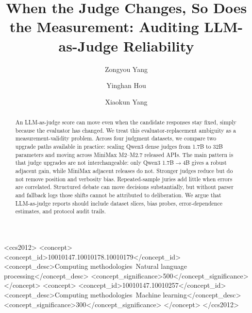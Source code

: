 \documentclass[sigconf,nonacm]{acmart}
\begin{document}
\title[When the Judge Changes, So Does the Measurement]{When the Judge Changes, So Does the Measurement: Auditing LLM-as-Judge Reliability}

\author{Zongyou Yang}

\author{Yinghan Hou}

\author{Xiaokun Yang}

\renewcommand{\shortauthors}{Z. Yang, Y. Hou, and X. Yang}

\begin{abstract}
An LLM-as-judge score can move even when the candidate responses stay fixed, simply because the evaluator has changed. We treat this evaluator-replacement ambiguity as a measurement-validity problem. Across four judgment datasets, we compare two upgrade paths available in practice: scaling Qwen3 dense judges from 1.7B to 32B parameters and moving across MiniMax M2--M2.7 released APIs. The main pattern is that judge upgrades are not interchangeable: only Qwen3 1.7B$\rightarrow$4B gives a robust adjacent gain, while MiniMax adjacent releases do not. Stronger judges reduce but do not remove position and verbosity bias. Repeated-sample juries add little when errors are correlated. Structured debate can move decisions substantially, but without parser and fallback logs those shifts cannot be attributed to deliberation. We argue that LLM-as-judge reports should include dataset slices, bias probes, error-dependence estimates, and protocol audit trails.
\end{abstract}

\begin{CCSXML}
<ccs2012>
<concept>
<concept_id>10010147.10010178.10010179</concept_id>
<concept_desc>Computing methodologies~Natural language processing</concept_desc>
<concept_significance>500</concept_significance>
</concept>
<concept>
<concept_id>10010147.10010257</concept_id>
<concept_desc>Computing methodologies~Machine learning</concept_desc>
<concept_significance>300</concept_significance>
</concept>
</ccs2012>
\end{CCSXML}
\end{document}
